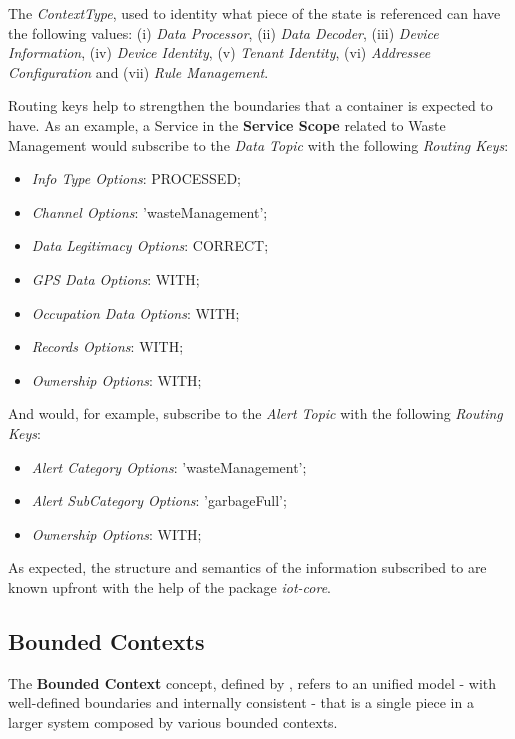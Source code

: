 The \textit{ContextType}, used to identity what piece of the state is referenced can have the following values: (i) \textit{Data Processor}, (ii) \textit{Data Decoder}, (iii) \textit{Device Information}, (iv) \textit{Device Identity}, (v) \textit{Tenant Identity}, (vi) \textit{Addressee Configuration} and (vii) \textit{Rule Management}.

Routing keys help to strengthen the boundaries that a container is expected to have. As an example, a Service in the \textbf{Service Scope} related to Waste Management would subscribe to the \textit{Data Topic} with the following \textit{Routing Keys}: 

\begin{itemize}
   \item \textit{Info Type Options}: PROCESSED;
   \item \textit{Channel Options}: 'wasteManagement';
   \item \textit{Data Legitimacy Options}: CORRECT;
   \item \textit{GPS Data Options}: WITH;
   \item \textit{Occupation Data Options}: WITH;
   \item \textit{Records Options}: WITH;
   \item \textit{Ownership Options}: WITH;
\end{itemize}

And would, for example, subscribe to the \textit{Alert Topic} with the following \textit{Routing Keys}:

\begin{itemize}
   \item \textit{Alert Category Options}: 'wasteManagement';
   \item \textit{Alert SubCategory Options}: 'garbageFull'; 
   \item \textit{Ownership Options}: WITH;
\end{itemize}

As expected, the structure and semantics of the information subscribed to are known upfront with the help of the package \textit{iot-core}.

\subsection{Bounded Contexts}
\label{subsec:design:domain:bounded_contexts}

The \textbf{Bounded Context} concept, defined by \cite{evans2014domain}, refers to an unified model - with well-defined boundaries and internally consistent - that is a single piece in a  larger system composed by various bounded contexts.

